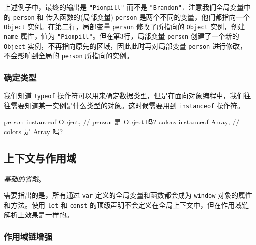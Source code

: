 上述例子中，最终的输出是 \texttt{"Pionpill"} 而不是 \texttt{"Brandon"}，注意我们全局变量中的 \texttt{person} 和 传入函数的(局部变量) \texttt{person} 是两个不同的变量，他们都指向一个 \texttt{Object} 实例。在第二行，局部变量 \texttt{person} 修改了所指向的 \texttt{Object} 实例，创建 \texttt{name} 属性，值为 \texttt{"Pionpill"}。但在第3行，局部变量 \texttt{person} 创建了一个新的 \texttt{Object} 实例，不再指向原先的区域，因此此时再对局部变量 \texttt{person} 进行修改，不会影响到全局的 \texttt{person} 所指向的实例。


\subsubsection*{确定类型}

我们知道 \texttt{typeof} 操作符可以用来确定数据类型，但是在面向对象编程中，我们往往需要知道某一实例是什么类型的对象。这时候需要用到 \texttt{instanceof} 操作符。 

\begin{JavaScript}
person instanceof Object;   // person 是 Object 吗?
colors instanceof Array;    // colors 是 Array 吗?
\end{JavaScript}


\subsection{上下文与作用域}

\textit{基础的省略}。

需要指出的是，所有通过 \texttt{var} 定义的全局变量和函数都会成为 \texttt{window} 对象的属性和方法。使用 \texttt{let} 和 \texttt{const} 的顶级声明不会定义在全局上下文中，但在作用域链解析上效果是一样的。

\subsubsection*{作用域链增强}


